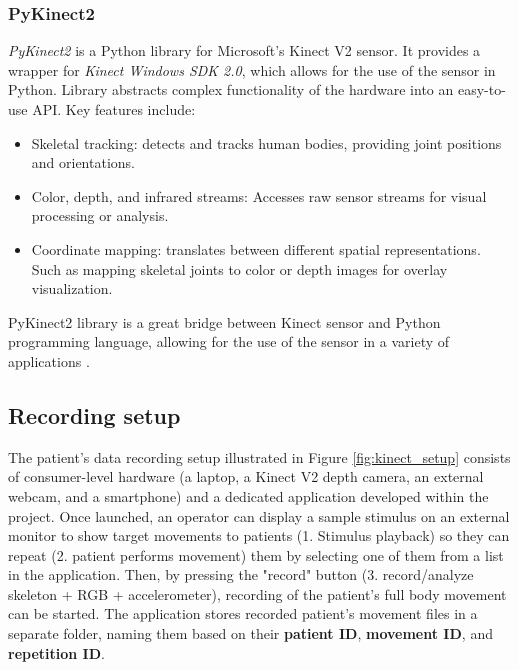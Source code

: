                     \subsubsection{PyKinect2}
                        \textit{PyKinect2} is a Python library for Microsoft's Kinect V2 sensor. It provides a wrapper for \textit{Kinect Windows SDK 2.0}, which allows for the use of the sensor in Python. Library abstracts complex functionality of the hardware into an easy-to-use API. Key features include:
                        \begin{itemize}
                            \item Skeletal tracking: detects and tracks human bodies, providing joint positions and orientations.
                            \item Color, depth, and infrared streams: Accesses raw sensor streams for visual processing or analysis.
                            \item Coordinate mapping: translates between different spatial representations. Such as mapping skeletal joints to color or depth images for overlay visualization.
                        \end{itemize}
                        PyKinect2 library is a great bridge between Kinect sensor and Python programming language, allowing for the use of the sensor in a variety of applications \cite{GitHubKinectPyKinect2}.
               
                        \newpage
                        
        \subsection{Recording setup}

                    The patient's data recording setup illustrated in Figure \ref{fig:kinect_setup} consists of consumer-level hardware (a laptop, a Kinect V2 depth camera, an external webcam, and a smartphone) and a dedicated application developed within the project. 
                    Once launched, an operator can display a sample stimulus on an external monitor to show target movements to patients (1. Stimulus playback) so they can repeat (2. patient performs movement) them by selecting one of them from a list in the application.
                    Then, by pressing the "record" button (3. record/analyze skeleton + RGB + accelerometer), recording of the patient's full body movement can be started. 
                    The application stores recorded patient's movement files in a separate folder, naming them based on their \textbf{patient ID}, \textbf{movement ID}, and \textbf{repetition ID}.

